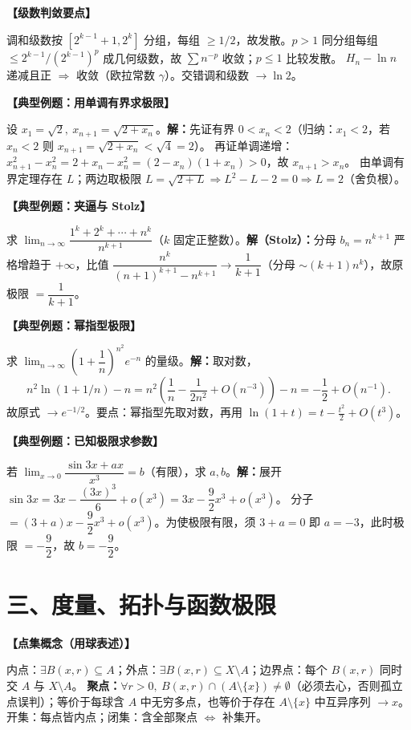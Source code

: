 \documentclass[12pt,a4paper,UTF8]{ctexart}
\newenvironment{kp}[1]{\par\smallskip\noindent\textbf{【#1】}\par\nobreak\smallskip}{\par\smallskip}
\begin{document}
\begin{kp}{级数判敛要点}
调和级数按 $[2^{k-1}+1,2^k]$ 分组，每组 $\ge1/2$，故发散。$p>1$ 同分组每组 $\le 2^{k-1}/(2^{k-1})^p$ 成几何级数，故 $\sum n^{-p}$ 收敛；$p\le1$ 比较发散。
$H_n-\ln n$ 递减且正 $\Rightarrow$ 收敛（欧拉常数 $\gamma$）。交错调和级数 $\to\ln2$。
\end{kp}

\begin{kp}{典型例题：用单调有界求极限}
设 $x_1=\sqrt2,\ x_{n+1}=\sqrt{2+x_n}$。\textbf{解：}先证有界 $0<x_n<2$（归纳：$x_1<2$，若 $x_n<2$ 则 $x_{n+1}=\sqrt{2+x_n}<\sqrt4=2$）。
再证单调递增：$x_{n+1}^2-x_n^2=2+x_n-x_n^2=(2-x_n)(1+x_n)>0$，故 $x_{n+1}>x_n$。
由单调有界定理存在 $L$；两边取极限 $L=\sqrt{2+L}\Rightarrow L^2-L-2=0\Rightarrow L=2$（舍负根）。
\end{kp}

\begin{kp}{典型例题：夹逼与 Stolz}
求 $\lim_{n\to\infty}\dfrac{1^k+2^k+\cdots+n^k}{n^{k+1}}$（$k$ 固定正整数）。\textbf{解（Stolz）：}分母 $b_n=n^{k+1}$ 严格增趋于 $+\infty$，比值
$\dfrac{n^k}{(n+1)^{k+1}-n^{k+1}}\to\dfrac{1}{k+1}$（分母 $\sim(k+1)n^k$），故原极限 $=\dfrac{1}{k+1}$。
\end{kp}

\begin{kp}{典型例题：幂指型极限}
求 $\lim_{n\to\infty}\left(1+\dfrac1n\right)^{n^2}e^{-n}$ 的量级。\textbf{解：}取对数，
\[
n^2\ln(1+1/n)-n=n^2\left(\dfrac1n-\dfrac{1}{2n^2}+O(n^{-3})\right)-n=-\dfrac12+O(n^{-1}).
\]
故原式 $\to e^{-1/2}$。要点：幂指型先取对数，再用 $\ln(1+t)=t-\frac{t^2}{2}+O(t^3)$。
\end{kp}

\begin{kp}{典型例题：已知极限求参数}
若 $\lim_{x\to0}\dfrac{\sin 3x+ax}{x^3}=b$（有限），求 $a,b$。\textbf{解：}展开 $\sin 3x=3x-\dfrac{(3x)^3}{6}+o(x^3)=3x-\dfrac{9}{2}x^3+o(x^3)$。
分子 $=(3+a)x-\dfrac92x^3+o(x^3)$。为使极限有限，须 $3+a=0$ 即 $a=-3$，此时极限 $=-\dfrac92$，故 $b=-\dfrac92$。
\end{kp}

\section*{三、度量、拓扑与函数极限}

\begin{kp}{点集概念（用球表述）}
内点：$\exists B(x,r)\subseteq A$；外点：$\exists B(x,r)\subseteq X\setminus A$；边界点：每个 $B(x,r)$ 同时交 $A$ 与 $X\setminus A$。
\textbf{聚点：}$\forall r>0,\ B(x,r)\cap(A\setminus\{x\})\ne\emptyset$（必须去心，否则孤立点误判）；等价于每球含 $A$ 中无穷多点，也等价于存在 $A\setminus\{x\}$ 中互异序列 $\to x$。
开集：每点皆内点；闭集：含全部聚点 $\iff$ 补集开。
\end{kp}
\end{document}

